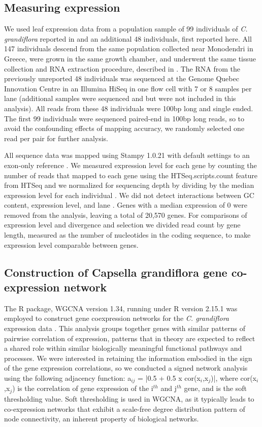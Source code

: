 \subsection{Measuring expression}
We used leaf expression data from a population sample of 99 individuals of \textit{C. grandiflora} reported in \citet{Josephs2015-nx} and an additional 48 individuals, first reported here. All 147 individuals descend from the same population collected near Monodendri in Greece, were grown in the same growth chamber, and underwent the same tissue collection and RNA extraction procedure, described in \citet{Josephs2015-nx}. The RNA from the previously unreported 48 individuals was sequenced at the Genome Quebec Innovation Centre in an Illumina HiSeq in one flow cell with 7 or 8 samples per lane (additional samples were sequenced and but were not included in this analysis). All reads from these 48 individuals were 100bp long and single ended. The first 99 individuals were sequenced paired-end in 100bp long reads, so to avoid the confounding effects of mapping accuracy, we randomly selected one read per pair for further analysis.

All sequence data was mapped using Stampy 1.0.21 \citep{Lunter2011-uc} with default settings to an exon-only reference \citep{Josephs2015-nx}. We measured expression level for each gene by counting the number of reads that mapped to each gene using the HTSeq.scripts.count feature from HTSeq and we normalized for sequencing depth by dividing by the median expression level for each individual \citep{Anders2015-qa}. We did not detect interactions between GC content, expression level, and lane \citep{Josephs2015-nx}. Genes with a median expression of 0 were removed from the analysis, leaving a total of 20,570 genes. For comparisons of expression level and divergence and selection we divided read count by gene length, measured as the number of nucleotides in the coding sequence, to make expression level comparable between genes.

\subsection{Construction of Capsella grandiflora gene co-expression network}
The R package, WGCNA version 1.34, running under R version 2.15.1 \citep{r} was employed to construct gene coexpression networks for the \textit{C. grandiflora} expression data \citep{langfelder2008}. This analysis groups together genes with similar patterns of pairwise correlation of expression, patterns that in theory are expected to reflect a shared role within similar biologically meaningful functional pathways and processes. We were interested in retaining the information embodied in the sign of the gene expression correlations, so we conducted a signed network analysis using the following adjacency function: a$_{ij}$ = |0.5 + 0.5 x cor(x$_{i}$,x$_{j}$)|, where cor(x$_{i}$,x$_{j}$) is the correlation of gene expression of the i$^{th}$ and j$^{th}$ gene, and is the soft thresholding value. Soft thresholding is used in WGCNA, as it typically leads to co-expression networks that exhibit a scale-free degree distribution pattern of node connectivity, an inherent property of biological networks. 

